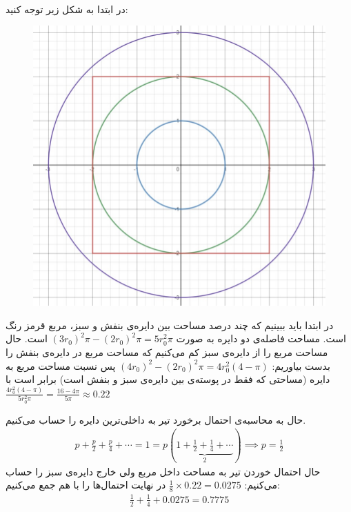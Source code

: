 \\
در ابتدا به شکل زیر توجه کنید:
\begin{figure}[H]
    \centerline{\includegraphics[scale=0.35]{pics/3.jpg}}
\end{figure}
در ابتدا باید ببینیم که چند درصد مساحت بین دایره‌ی بنفش و سبز، مربع قرمز رنگ است.
مساحت فاصله‌ی دو دایره به صورت
$(3r_0)^2 \pi - (2r_0)^2 \pi = 5r_0^2 \pi$
است. حال مساحت مربع را از دایره‌ی سبز کم می‌کنیم که مساحت مربع در دایره‌ی بنفش را بدست بیاوریم:
$(4r_0)^2 - (2r_0)^2 \pi = 4 r_0^2 (4 - \pi)$
پس نسبت مساحت مربع به دایره (مساحتی که فقط در پوسته‌ی بین دایره‌ی سبز و بنفش است)
برابر است با
$\frac{4 r_0^2 (4 - \pi)}{5r_0^2 \pi} = \frac{16 - 4\pi}{5 \pi} \approx 0.22$

حال به محاسبه‌ی احتمال برخورد تیر به داخلی‌ترین دایره را حساب می‌کنیم.
\begin{gather*}
p + \frac{p}{2} + \frac{p}{4} + \cdots = 1 = p (\underbrace{1 + \frac{1}{2} + \frac{1}{4} + \cdots}_{2})
\implies p = \frac{1}{2}
\end{gather*}
حال احتمال خوردن تیر به مساحت داخل مربع ولی خارج دایره‌ی سبز را حساب می‌کنیم:
$\frac{1}{8} \times 0.22 = 0.0275$
در نهایت احتمال‌ها را با هم جمع می‌کنیم:
\begin{gather*}
    \frac{1}{2} + \frac{1}{4} + 0.0275 = 0.7775
\end{gather*}